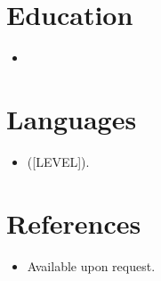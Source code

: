 \documentclass[11pt,a4paper,sans]{moderncv}
\begin{document}
\section{Education}
\vspace{1pt}
\begin{itemize}

\item{\cventry{[YYYY]--[YYYY]}{[DEGREE]}{[INSTITUTION]}{[COUNTRY]}{}{}}

\end{itemize}


\section{Languages}
\vspace{1pt}
\begin{itemize}
\item [LANGUAGE] ([LEVEL]).
\end{itemize}


\section{References}
\vspace{1pt}
\begin{itemize}
\item{Available upon request.}
\end{itemize}
\end{document}
